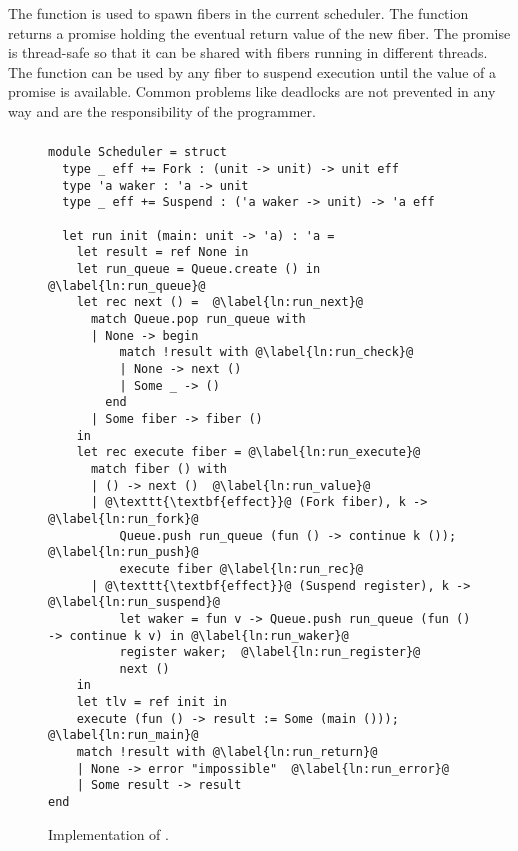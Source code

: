The  function is used to spawn fibers in the current scheduler.
The function returns a promise holding the eventual return value of the new fiber.
The promise is thread-safe so that it can be shared with fibers running in different threads.
The  function can be used by any fiber to suspend execution until the value of a promise is available.
Common problems like deadlocks are not prevented in any way and are the responsibility of the programmer.

\subsubsection{}
\label{sec:sched-impl-run}

\begin{figure}[ht]
  \begin{verbatim}
module Scheduler = struct
  type _ eff += Fork : (unit -> unit) -> unit eff
  type 'a waker : 'a -> unit
  type _ eff += Suspend : ('a waker -> unit) -> 'a eff

  let run init (main: unit -> 'a) : 'a =
    let result = ref None in
    let run_queue = Queue.create () in  @\label{ln:run_queue}@
    let rec next () =  @\label{ln:run_next}@
      match Queue.pop run_queue with
      | None -> begin
          match !result with @\label{ln:run_check}@ 
          | None -> next ()
          | Some _ -> ()
        end
      | Some fiber -> fiber () 
    in
    let rec execute fiber = @\label{ln:run_execute}@ 
      match fiber () with
      | () -> next ()  @\label{ln:run_value}@
      | @\texttt{\textbf{effect}}@ (Fork fiber), k ->  @\label{ln:run_fork}@
          Queue.push run_queue (fun () -> continue k ()); @\label{ln:run_push}@ 
          execute fiber @\label{ln:run_rec}@
      | @\texttt{\textbf{effect}}@ (Suspend register), k ->  @\label{ln:run_suspend}@
          let waker = fun v -> Queue.push run_queue (fun () -> continue k v) in @\label{ln:run_waker}@  
          register waker;  @\label{ln:run_register}@
          next ()
    in
    let tlv = ref init in
    execute (fun () -> result := Some (main ())); @\label{ln:run_main}@ 
    match !result with @\label{ln:run_return}@
    | None -> error "impossible"  @\label{ln:run_error}@
    | Some result -> result
end
  \end{verbatim}
  \caption{Implementation of .}
  \label{fig:sched-impl-run}
\end{figure}


